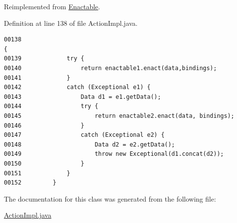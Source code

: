 Reimplemented from \hyperlink{interfaceEnactable_a0}{Enactable}.

Definition at line 138 of file Action\-Impl.java.\footnotesize\begin{verbatim}00138                                                                                    {
00139             try {
00140                 return enactable1.enact(data,bindings);
00141             }
00142             catch (Exceptional e1) {
00143                 Data d1 = e1.getData();
00144                 try {
00145                     return enactable2.enact(data, bindings);
00146                 }
00147                 catch (Exceptional e2) {
00148                     Data d2 = e2.getData();
00149                     throw new Exceptional(d1.concat(d2));
00150                 }
00151             }
00152         }
\end{verbatim}\normalsize 


The documentation for this class was generated from the following file:\begin{CompactItemize}
\item 
\hyperlink{ActionImpl_8java-source}{Action\-Impl.java}\end{CompactItemize}
